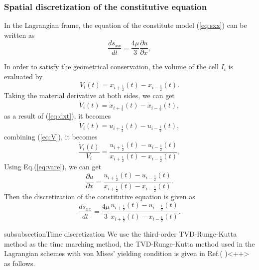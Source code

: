 \documentclass{article}
\numberwithin{equation}{section}
\numberwithin{table}{section}
\begin{document}
\subsubsection{Spatial discretization of the constitutive equation}
In the Lagrangian frame, the equation of the constitute model (\ref{eq:sxx}) can be written as 
\begin{equation}
  \frac{ds_{xx}}{dt} = \frac{4\mu }{3} \frac{\partial u}{\partial x}, 
\end{equation}

In order to satisfy the geometrical conservation, the volume of the cell $I_i$ is evaluated by 
\begin{equation}\label{eq:V}
  V_i(t) = x_{i+\frac{1}{2}}(t) - x_{i-\frac{1}{2}}(t).
\end{equation}
Taking the material derivative at both sides, we can get
\begin{equation}\label{eq:dotV}
  \dot{V}_i(t) = \dot{x}_{i+\frac{1}{2}}(t) - \dot{x}_{i-\frac{1}{2}}(t),
\end{equation}
as a result of (\ref{eq:dxt}), it becomes 
\begin{equation}\label{eq:dotV}
  \dot{V}_i(t) = u_{i+\frac{1}{2}}(t) - u_{i-\frac{1}{2}}(t),
\end{equation}
combining (\ref{eq:V}), it becomes
\begin{equation}
  \frac{\dot{V}_i(t)}{V_i} =\frac{ u_{i+\frac{1}{2}}(t) - u_{i-\frac{1}{2}}(t)}{ x_{i+\frac{1}{2}}(t) - x_{i-\frac{1}{2}}(t)},
\end{equation}
Using Eq.(\ref{eq:vare}), we can get
\begin{equation}
  \frac{\partial u}{\partial x} =\frac{ u_{i+\frac{1}{2}}(t) - u_{i-\frac{1}{2}}(t)}{ x_{i+\frac{1}{2}}(t) - x_{i-\frac{1}{2}}(t)}.
\end{equation}
Then  the  discretization of the constitutive equation is given as
\begin{equation}\label{eq:semSxx}
  \frac{d s_{xx}}{dt } =\frac{4\mu}{3} \frac{ u_{i+\frac{1}{2}}(t) - u_{i-\frac{1}{2}}(t)}{ x_{i+\frac{1}{2}}(t) - x_{i-\frac{1}{2}}(t)}.
\end{equation}

subsubsection{Time discretization}
We use the third-order TVD-Runge-Kutta method  as the time marching method, the TVD-Runge-Kutta method used in the Lagrangian schemes with von Mises' yielding condition is given in Ref.( )<++> as follows.
\end{document}
